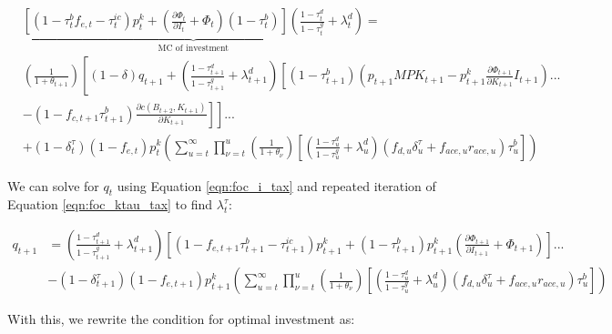 \begin{equation}
\begin{split}
&\underbrace{ \left[(1-\tau^{b}_{t}f_{e,t}-\tau^{ic}_{t})p^{k}_{t} + \left(\frac{\partial \Phi_{t}}{\partial I_{t}} + \Phi_{t}\right)(1-\tau^{b}_{t})\right]\left(\frac{1-\tau^{d}_{t}}{1-\tau^{g}_{t}} + \lambda^{d}_{t}\right)}_{\text{MC of investment}} = \\
& \left(\frac{1}{1+\theta_{t+1}}\right)\left[(1-\delta)q_{t+1}  +  \left(\frac{1-\tau^{d}_{t+1}}{1-\tau^{g}_{t+1}} + \lambda^{d}_{t+1} \right)\left[(1-\tau^{b}_{t+1})\left(p_{t+1}MPK_{t+1}- p^{k}_{t+1}\frac{\partial \Phi_{t+1}}{\partial K_{t+1}}I_{t+1}\right)  ... \right.\right. \\
& \left.\left.-(1-f_{c,t+1}\tau^{b}_{t+1}) \frac{\partial c(B_{t+2},K_{t+1})}{\partial K_{t+1}} \right] \right] ...\\
&  + (1-\delta^{\tau}_{t})(1-f_{e,t})p^{k}_{t}\left(\sum_{u=t}^{\infty} \prod_{\nu=t}^{u}\left(\frac{1}{1+\theta_{\nu}}\right)\left[\left(\frac{1-\tau^{d}_{u}}{1-\tau^{g}_{u}}+\lambda^{d}_{u}\right)\left( f_{d,u}\delta^{\tau}_{u}+f_{ace,u}r_{ace,u} \right)\tau^{b}_{u}\right]\right)
\end{split}
\end{equation}

We can solve for $q_{t}$ using Equation \ref{eqn:foc_i_tax} and repeated iteration of Equation \ref{eqn:foc_ktau_tax} to find $\lambda^{\tau}_{t}$:

\begin{equation}
\begin{split}
q_{t+1} & =  \left(\frac{1-\tau^{d}_{t+1}}{1-\tau^{g}_{t+1}} + \lambda^{d}_{t+1}\right)\left[(1-f_{e,t+1}\tau^{b}_{t+1}-\tau^{ic}_{t+1})p^{k}_{t+1}+ (1-\tau^{b}_{t+1})p^{k}_{t+1}\left(\frac{\partial \Phi_{t+1}}{\partial I_{t+1}} + \Phi_{t+1}\right)\right]... \\
&  -  (1-\delta^{\tau}_{t+1})(1-f_{e,t+1})p^{k}_{t+1}\left(\sum_{u=t}^{\infty} \prod_{\nu=t}^{u}\left(\frac{1}{1+\theta_{\nu}}\right)\left[\left(\frac{1-\tau^{d}_{u}}{1-\tau^{g}_{u}}+\lambda^{d}_{u}\right)\left( f_{d,u}\delta^{\tau}_{u}+f_{ace,u}r_{ace,u} \right)\tau^{b}_{u}\right]\right)
\end{split}
\end{equation}

With this, we rewrite the condition for optimal investment as: 

